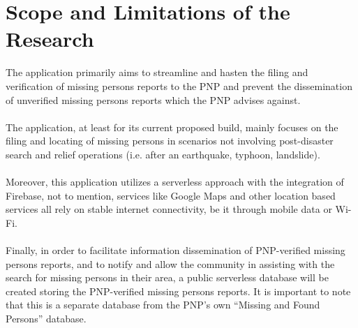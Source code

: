 \section{Scope and Limitations of the Research}
\label{sec:scopelimitations}

The application primarily aims to streamline and hasten the filing and verification of missing persons reports to the PNP and prevent the dissemination of unverified missing persons reports which the PNP advises against.
\\\\The application, at least for its current proposed build, mainly focuses on the filing and locating of missing persons in scenarios not involving post-disaster search and relief operations (i.e. after an earthquake, typhoon, landslide).
\\\\Moreover, this application utilizes a serverless approach with the integration of Firebase, not to mention, services like Google Maps and other location based services all rely on stable internet connectivity, be it through mobile data or Wi-Fi.
\\\\Finally, in order to facilitate information dissemination of PNP-verified missing persons reports, and to notify and allow the community in assisting with the search for missing persons in their area, a public serverless database will be created storing the PNP-verified missing persons reports. It is important to note that this is a separate database from the PNP’s own “Missing and Found Persons” database.
